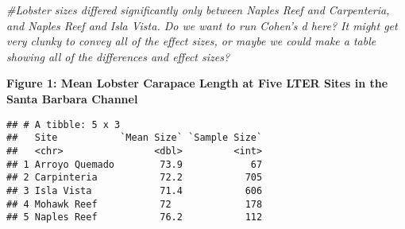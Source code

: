 \documentclass[]{article}
\newenvironment{Shaded}{\begin{snugshade}}{\end{snugshade}}
\newcommand{\KeywordTok}[1]{\textcolor[rgb]{0.13,0.29,0.53}{\textbf{#1}}}
\newcommand{\DataTypeTok}[1]{\textcolor[rgb]{0.13,0.29,0.53}{#1}}
\newcommand{\DecValTok}[1]{\textcolor[rgb]{0.00,0.00,0.81}{#1}}
\newcommand{\StringTok}[1]{\textcolor[rgb]{0.31,0.60,0.02}{#1}}
\newcommand{\CommentTok}[1]{\textcolor[rgb]{0.56,0.35,0.01}{\textit{#1}}}
\newcommand{\OperatorTok}[1]{\textcolor[rgb]{0.81,0.36,0.00}{\textbf{#1}}}
\newcommand{\NormalTok}[1]{#1}
\begin{document}
\begin{Shaded}
\begin{Highlighting}[]
\CommentTok{#Lobster sizes differed significantly only between Naples Reef and Carpenteria, and Naples Reef and Isla Vista. Do we want to run Cohen's d here?  It might get very clunky to convey all of the effect sizes, or maybe we could make a table showing all of the differences and effect sizes?}
\end{Highlighting}
\end{Shaded}

\textbf{Figure 1: Mean Lobster Carapace Length at Five LTER Sites in the
Santa Barbara Channel}

\begin{Shaded}
\end{Shaded}

\begin{verbatim}
## # A tibble: 5 x 3
##   Site           `Mean Size` `Sample Size`
##   <chr>                <dbl>         <int>
## 1 Arroyo Quemado        73.9            67
## 2 Carpinteria           72.2           705
## 3 Isla Vista            71.4           606
## 4 Mohawk Reef           72             178
## 5 Naples Reef           76.2           112
\end{verbatim}

\begin{Shaded}
\end{Shaded}
\end{document}
